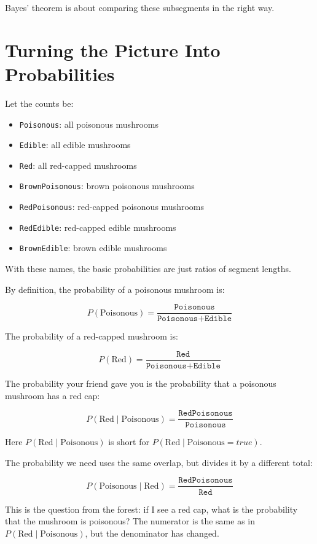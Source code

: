 \documentclass[11pt]{article}
\newcommand{\code}[1]{\texttt{#1}}
\begin{document}
Bayes' theorem is about comparing these subsegments in the right way.

\section*{Turning the Picture Into Probabilities}

Let the counts be:

\begin{itemize}
  \item \code{Poisonous}: all poisonous mushrooms
  \item \code{Edible}: all edible mushrooms
  \item \code{Red}: all red-capped mushrooms
  \item \code{BrownPoisonous}: brown poisonous mushrooms
  \item \code{RedPoisonous}: red-capped poisonous mushrooms
  \item \code{RedEdible}: red-capped edible mushrooms
  \item \code{BrownEdible}: brown edible mushrooms
\end{itemize}

With these names, the basic probabilities are just ratios of segment lengths.

By definition, the probability of a poisonous mushroom is:

\[
P(\text{Poisonous}) = \frac{\code{Poisonous}}{\code{Poisonous} + \code{Edible}}
\]

The probability of a red-capped mushroom is:

\[
P(\text{Red}) = \frac{\code{Red}}{\code{Poisonous} + \code{Edible}}
\]

The probability your friend gave you is the probability that a poisonous mushroom has a red cap:

\[
P(\text{Red}\mid\text{Poisonous}) = \frac{\code{RedPoisonous}}{\code{Poisonous}}
\]

Here $P(\text{Red}\mid\text{Poisonous})$ is short for $P(\text{Red}\mid\text{Poisonous} = true)$.

The probability we need uses the same overlap, but divides it by a different total:

\[
P(\text{Poisonous}\mid\text{Red}) = \frac{\code{RedPoisonous}}{\code{Red}}
\]

This is the question from the forest: if I see a red cap, what is the probability that the mushroom is poisonous? The numerator is the same as in $P(\text{Red}\mid\text{Poisonous})$, but the denominator has changed.
\end{document}
